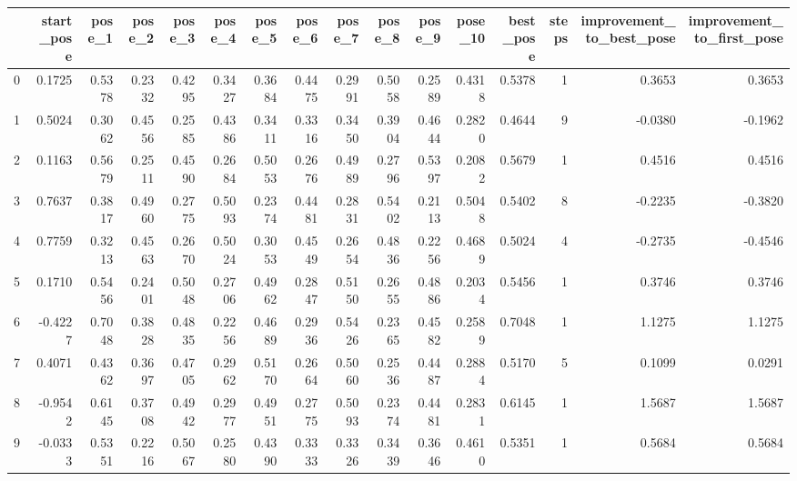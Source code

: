 \begin{tabular}{lrrrrrrrrrrrrrrr}
\toprule
{} &  start\_pose &  pose\_1 &  pose\_2 &  pose\_3 &  pose\_4 &  pose\_5 &  pose\_6 &  pose\_7 &  pose\_8 &  pose\_9 &  pose\_10 &  best\_pose &  steps &  improvement\_to\_best\_pose &  improvement\_to\_first\_pose \\
\midrule
0 &      0.1725 &  0.5378 &  0.2332 &  0.4295 &  0.3427 &  0.3684 &  0.4475 &  0.2991 &  0.5058 &  0.2589 &   0.4318 &     0.5378 &      1 &                    0.3653 &                     0.3653 \\
1 &      0.5024 &  0.3062 &  0.4556 &  0.2585 &  0.4386 &  0.3411 &  0.3316 &  0.3450 &  0.3904 &  0.4644 &   0.2820 &     0.4644 &      9 &                   -0.0380 &                    -0.1962 \\
2 &      0.1163 &  0.5679 &  0.2511 &  0.4590 &  0.2684 &  0.5053 &  0.2676 &  0.4989 &  0.2796 &  0.5397 &   0.2082 &     0.5679 &      1 &                    0.4516 &                     0.4516 \\
3 &      0.7637 &  0.3817 &  0.4960 &  0.2775 &  0.5093 &  0.2374 &  0.4481 &  0.2831 &  0.5402 &  0.2113 &   0.5048 &     0.5402 &      8 &                   -0.2235 &                    -0.3820 \\
4 &      0.7759 &  0.3213 &  0.4563 &  0.2670 &  0.5024 &  0.3053 &  0.4549 &  0.2654 &  0.4836 &  0.2256 &   0.4689 &     0.5024 &      4 &                   -0.2735 &                    -0.4546 \\
5 &      0.1710 &  0.5456 &  0.2401 &  0.5048 &  0.2706 &  0.4962 &  0.2847 &  0.5150 &  0.2655 &  0.4886 &   0.2034 &     0.5456 &      1 &                    0.3746 &                     0.3746 \\
6 &     -0.4227 &  0.7048 &  0.3828 &  0.4835 &  0.2256 &  0.4689 &  0.2936 &  0.5426 &  0.2365 &  0.4582 &   0.2589 &     0.7048 &      1 &                    1.1275 &                     1.1275 \\
7 &      0.4071 &  0.4362 &  0.3697 &  0.4705 &  0.2962 &  0.5170 &  0.2664 &  0.5060 &  0.2536 &  0.4487 &   0.2884 &     0.5170 &      5 &                    0.1099 &                     0.0291 \\
8 &     -0.9542 &  0.6145 &  0.3708 &  0.4942 &  0.2977 &  0.4951 &  0.2775 &  0.5093 &  0.2374 &  0.4481 &   0.2831 &     0.6145 &      1 &                    1.5687 &                     1.5687 \\
9 &     -0.0333 &  0.5351 &  0.2216 &  0.5067 &  0.2580 &  0.4390 &  0.3333 &  0.3326 &  0.3439 &  0.3646 &   0.4610 &     0.5351 &      1 &                    0.5684 &                     0.5684 \\
\bottomrule
\end{tabular}
